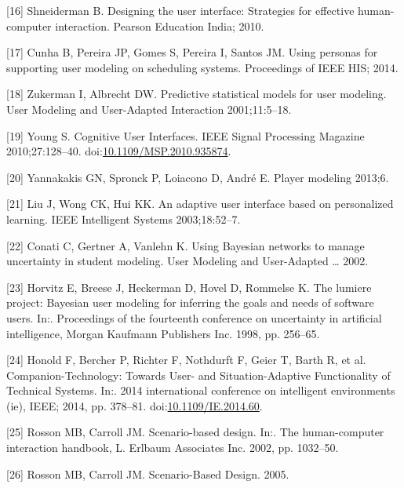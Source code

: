 \documentclass[]{article}
\begin{document}
\hypertarget{ref-shneiderman2010designing}{}
{[}16{]} Shneiderman B. Designing the user interface: Strategies for
effective human-computer interaction. Pearson Education India; 2010.

\hypertarget{ref-Cunha:2014vu}{}
{[}17{]} Cunha B, Pereira JP, Gomes S, Pereira I, Santos JM. Using
personas for supporting user modeling on scheduling systems. Proceedings
of IEEE HIS; 2014.

\hypertarget{ref-Anonymous:98QvTtXB}{}
{[}18{]} Zukerman I, Albrecht DW. Predictive statistical models for user
modeling. User Modeling and User-Adapted Interaction 2001;11:5--18.

\hypertarget{ref-Young:2010ck}{}
{[}19{]} Young S. Cognitive User Interfaces. IEEE Signal Processing
Magazine 2010;27:128--40.
doi:\href{https://doi.org/10.1109/MSP.2010.935874}{10.1109/MSP.2010.935874}.

\hypertarget{ref-Anonymous:2013be}{}
{[}20{]} Yannakakis GN, Spronck P, Loiacono D, André E. Player modeling
2013;6.

\hypertarget{ref-Anonymous:tFYXZ8fI}{}
{[}21{]} Liu J, Wong CK, Hui KK. An adaptive user interface based on
personalized learning. IEEE Intelligent Systems 2003;18:52--7.

\hypertarget{ref-Anonymous:rA5_Wtin}{}
{[}22{]} Conati C, Gertner A, Vanlehn K. Using Bayesian networks to
manage uncertainty in student modeling. User Modeling and User-Adapted
\ldots{} 2002.

\hypertarget{ref-Anonymous:6QvxqPLs}{}
{[}23{]} Horvitz E, Breese J, Heckerman D, Hovel D, Rommelse K. The
lumiere project: Bayesian user modeling for inferring the goals and
needs of software users. In:. Proceedings of the fourteenth conference
on uncertainty in artificial intelligence, Morgan Kaufmann Publishers
Inc. 1998, pp. 256--65.

\hypertarget{ref-Honold:2014gq}{}
{[}24{]} Honold F, Bercher P, Richter F, Nothdurft F, Geier T, Barth R,
et al. Companion-Technology: Towards User- and Situation-Adaptive
Functionality of Technical Systems. In:. 2014 international conference
on intelligent environments (ie), IEEE; 2014, pp. 378--81.
doi:\href{https://doi.org/10.1109/IE.2014.60}{10.1109/IE.2014.60}.

\hypertarget{ref-Rosson:2002vj}{}
{[}25{]} Rosson MB, Carroll JM. Scenario-based design. In:. The
human-computer interaction handbook, L. Erlbaum Associates Inc. 2002,
pp. 1032--50.

\hypertarget{ref-Rosson:2005vj}{}
{[}26{]} Rosson MB, Carroll JM. Scenario-Based Design. 2005.
\end{document}
